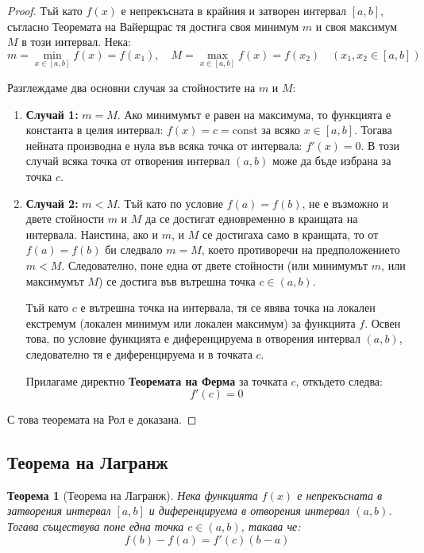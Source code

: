\documentclass{scrartcl}
\newtheorem{theorem}{Теорема}
\begin{document}
\begin{FlushLeft}
\begin{proof}
Тъй като $f(x)$ е непрекъсната в крайния и затворен интервал $[a, b]$, съгласно Теоремата на Вайерщрас тя достига своя минимум $m$ и своя максимум $M$ в този интервал. Нека:
\[ m = \min_{x \in [a, b]} f(x) = f(x_1), \quad M = \max_{x \in [a, b]} f(x) = f(x_2) \quad (x_1, x_2 \in [a, b]) \]

Разглеждаме два основни случая за стойностите на $m$ и $M$:

\begin{enumerate}
    \item \textbf{Случай 1:} $m = M$.
    Ако минимумът е равен на максимума, то функцията е константа в целия интервал: $f(x) = c = \text{const}$ за всяко $x \in [a, b]$. Тогава нейната производна е нула във всяка точка от интервала: $f'(x) = 0$. В този случай всяка точка от отворения интервал $(a, b)$ може да бъде избрана за точка $c$.
    
    \item \textbf{Случай 2:} $m < M$.
    Тъй като по условие $f(a) = f(b)$, не е възможно и двете стойности $m$ и $M$ да се достигат едновременно в краищата на интервала. Наистина, ако и $m$, и $M$ се достигаха само в краищата, то от $f(a) = f(b)$ би следвало $m = M$, което противоречи на предположението $m < M$. Следователно, поне една от двете стойности (или минимумът $m$, или максимумът $M$) се достига във вътрешна точка $c \in (a, b)$.
    
    Тъй като $c$ е вътрешна точка на интервала, тя се явява точка на локален екстремум (локален минимум или локален максимум) за функцията $f$. Освен това, по условие функцията е диференцируема в отворения интервал $(a, b)$, следователно тя е диференцируема и в точката $c$. 
    
    Прилагаме директно \textbf{Теоремата на Ферма} за точката $c$, откъдето следва:
    \[ f'(c) = 0 \]
\end{enumerate}
С това теоремата на Рол е доказана.
\end{proof}

\subsection{Теорема на Лагранж}

\begin{theorem}[Теорема на Лагранж]
Нека функцията $f(x)$ е непрекъсната в затворения интервал $[a, b]$ и диференцируема в отворения интервал $(a, b)$. Тогава съществува поне една точка $c \in (a, b)$, такава че:
\[ f(b) - f(a) = f'(c)(b - a) \]
\end{theorem}


\end{FlushLeft}
\end{document}
